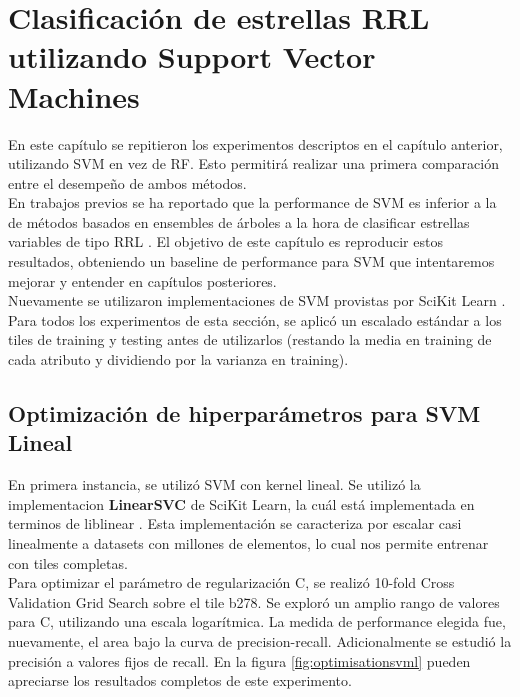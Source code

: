 \chapter{Clasificación de estrellas RRL utilizando Support Vector Machines}

En este capítulo se repitieron los experimentos descriptos en el capítulo anterior, utilizando SVM en vez de RF. Esto permitirá realizar una primera comparación entre el desempeño de ambos métodos. \\

En trabajos previos se ha reportado que la performance de SVM es inferior a la de métodos basados en ensembles de árboles a la hora de clasificar estrellas variables de tipo RRL \cite{jbc} \cite{elorrieta}. El objetivo de este capítulo es reproducir estos resultados, obteniendo un baseline de performance para SVM que intentaremos mejorar y entender en capítulos posteriores. \\

Nuevamente se utilizaron implementaciones de SVM provistas por SciKit Learn\cite{sklearn_api} \cite{pedregosa2011scikit}. Para todos los experimentos de esta sección, se aplicó un escalado estándar a los tiles de training y testing antes de utilizarlos (restando la media en training de cada atributo y dividiendo por la varianza en training).

\section{Optimización de hiperparámetros para SVM Lineal}

En primera instancia, se utilizó SVM con kernel lineal. Se utilizó la implementacion \textbf{LinearSVC} de SciKit Learn, la cuál está implementada en terminos de liblinear \cite{liblinear}. Esta implementación se caracteriza por escalar casi linealmente a datasets con millones de elementos, lo cual nos permite entrenar con tiles completas. \\

Para optimizar el parámetro de regularización C, se realizó 10-fold Cross Validation Grid Search sobre el tile b278. Se exploró un amplio rango de valores para C, utilizando una escala logarítmica. La medida de performance elegida fue, nuevamente, el area bajo la curva de precision-recall. Adicionalmente se estudió la precisión a valores fijos de recall. En la figura \ref{fig:optimisationsvml} pueden apreciarse los resultados completos de este experimento. \\ 

